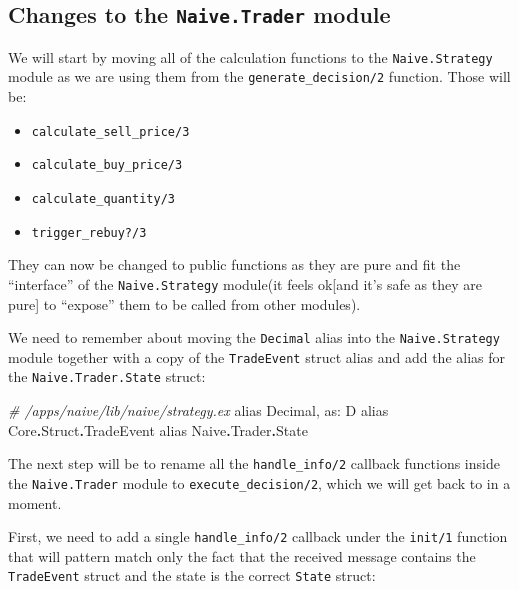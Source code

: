 \documentclass[
  oneside]{book}
\newenvironment{Shaded}{\begin{snugshade}}{\end{snugshade}}
\newcommand{\CommentTok}[1]{\textcolor[rgb]{0.56,0.35,0.01}{\textit{#1}}}
\newcommand{\ConstantTok}[1]{\textcolor[rgb]{0.56,0.35,0.01}{#1}}
\newcommand{\ImportTok}[1]{#1}
\newcommand{\NormalTok}[1]{#1}
\newcommand{\OperatorTok}[1]{\textcolor[rgb]{0.81,0.36,0.00}{\textbf{#1}}}
\newcommand{\VariableTok}[1]{\textcolor[rgb]{0.00,0.00,0.00}{#1}}
\providecommand{\tightlist}{%
  \setlength{\itemsep}{0pt}\setlength{\parskip}{0pt}}
\begin{document}
\subsection{\texorpdfstring{Changes to the \texttt{Naive.Trader} module}{Changes to the Naive.Trader module}}\label{changes-to-the-naive.trader-module}

We will start by moving all of the calculation functions to the \texttt{Naive.Strategy} module as we are using them from the \texttt{generate\_decision/2} function. Those will be:

\begin{itemize}
\tightlist
\item
  \texttt{calculate\_sell\_price/3}
\item
  \texttt{calculate\_buy\_price/3}
\item
  \texttt{calculate\_quantity/3}
\item
  \texttt{trigger\_rebuy?/3}
\end{itemize}

They can now be changed to public functions as they are pure and fit the ``interface'' of the \texttt{Naive.Strategy} module(it feels ok{[}and it's safe as they are pure{]} to ``expose'' them to be called from other modules).

We need to remember about moving the \texttt{Decimal} alias into the \texttt{Naive.Strategy} module together with a copy of the \texttt{TradeEvent} struct alias and add the alias for the \texttt{Naive.Trader.State} struct:

\begin{Shaded}
\begin{Highlighting}[]
\CommentTok{\# /apps/naive/lib/naive/strategy.ex}
  \ImportTok{alias} \ConstantTok{Decimal}\NormalTok{, }\VariableTok{as:}\NormalTok{ D}
  \ImportTok{alias} \ConstantTok{Core}\OperatorTok{.}\ConstantTok{Struct}\OperatorTok{.}\ConstantTok{TradeEvent}
  \ImportTok{alias} \ConstantTok{Naive}\OperatorTok{.}\ConstantTok{Trader}\OperatorTok{.}\ConstantTok{State}
\end{Highlighting}
\end{Shaded}

The next step will be to rename all the \texttt{handle\_info/2} callback functions inside the \texttt{Naive.Trader} module to \texttt{execute\_decision/2}, which we will get back to in a moment.

First, we need to add a single \texttt{handle\_info/2} callback under the \texttt{init/1} function that will pattern match only the fact that the received message contains the \texttt{TradeEvent} struct and the state is the correct \texttt{State} struct:
\end{document}
